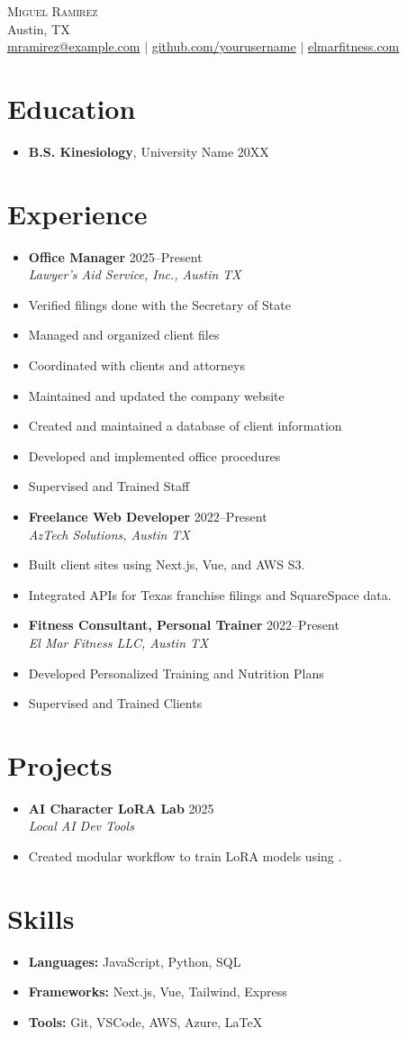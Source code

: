 \documentclass[letterpaper,10pt]{article}
\newcommand{\resumeItem}[1]{\item\small{#1}}
\newcommand{\resumeSubheading}[4]{
  \vspace{-1pt}\item
    \textbf{#1} \hfill #2 \\
    \textit{\small#3} \hfill \textit{\small #4}
}
\begin{document}
\begin{center}
  {\Huge \scshape Miguel Ramirez} \\ \vspace{1pt}
  Austin, TX \\ 
  \href{mailto:mramirez@example.com}{mramirez@example.com} $|$
  \href{https://github.com/yourusername}{github.com/yourusername} $|$
  \href{https://elmarfitness.com}{elmarfitness.com}
\end{center}

\section*{Education}
\begin{itemize}[leftmargin=0.15in]
  \item[]
    \textbf{B.S. Kinesiology}, University Name \hfill 20XX
\end{itemize}

\section*{Experience}
\begin{itemize}[leftmargin=0.15in]
  \resumeSubheading
    {Office Manager}{2025–Present}
    {Lawyer's Aid Service, Inc., Austin TX}{}
    \resumeItem{Verified filings done with the Secretary of State}
    \resumeItem{Managed and organized client files}
    \resumeItem{Coordinated with clients and attorneys}
    \resumeItem{Maintained and updated the company website}
    \resumeItem{Created and maintained a database of client information}
    \resumeItem{Developed and implemented office procedures}
    \resumeItem{Supervised and Trained Staff}
  \resumeSubheading
    {Freelance Web Developer}{2022–Present}
    {AzTech Solutions, Austin TX}{}
    \resumeItem{Built client sites using Next.js, Vue, and AWS S3.}
    \resumeItem{Integrated APIs for Texas franchise filings and SquareSpace data.}
  \resumeSubheading
    {Fitness Consultant, Personal Trainer}{2022–Present}
    {El Mar Fitness LLC, Austin TX}{}
    \resumeItem{Developed Personalized Training and Nutrition Plans}
    \resumeItem{Supervised and Trained Clients}
\end{itemize}

\section*{Projects}
\begin{itemize}[leftmargin=0.15in]
  \resumeSubheading
    {AI Character LoRA Lab}{2025}
    {Local AI Dev Tools}{}
    \resumeItem{Created modular workflow to train LoRA models using \texttt{\detokenize{kohya_ss}}.}
\end{itemize}

\section*{Skills}
\begin{itemize}[leftmargin=0.15in, label={}]
  \item \textbf{Languages:} JavaScript, Python, SQL
  \item \textbf{Frameworks:} Next.js, Vue, Tailwind, Express
  \item \textbf{Tools:} Git, VSCode, AWS, Azure, LaTeX
\end{itemize}
\end{document}
